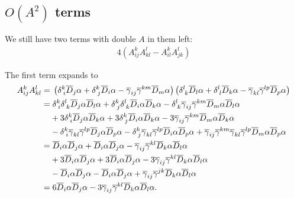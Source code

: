 \documentclass[aps,prd,preprint]{revtex4-1}
\newcommand{\ogamma}{\overline{\gamma}}
\newcommand{\OD}{\overline{D}}
\begin{document}
\subsection{\texorpdfstring{$O(A^2)$}{Double-A}  terms}

We still have two terms with double $A$ in them left:
\begin{align}\label{eq:double-A}
4 \left( A^k_{ij} A^l_{kl} - A^k_{il} A^l_{jk} \right)
\end{align}

The first term expands to
\begin{align}
A^k_{ij} A^l_{kl} = & \;
  \left( \delta^k_{\; i} \OD_j \alpha + \delta^k_{\; j} \OD_i \alpha - \ogamma_{ij} \ogamma^{km} \OD_m \alpha \right)
  \left( \delta^l_{\; k} \OD_l \alpha + \delta^l_{\; l} \OD_k \alpha - \ogamma_{kl} \ogamma^{lp} \OD_p \alpha \right) \\
= & \; \delta^k_{\; i} \delta^l_{\; k} \OD_j \alpha \OD_l \alpha + \delta^k_{\; j} \delta^l_{\; k} \OD_i \alpha  \OD_k \alpha -
  \delta^l_{\; k} \ogamma_{ij} \ogamma^{km} \OD_m \alpha \OD_l \alpha \notag \\
& + 3 \delta^k_{\; i} \OD_j \alpha \OD_k \alpha +3 \delta^k_{\; j} \OD_i \alpha \OD_k \alpha -
  3 \ogamma_{ij} \ogamma^{km} \OD_m \alpha \OD_k \alpha \notag \\
& - \delta^k_{\; i} \ogamma_{kl} \ogamma^{lp} \OD_j \alpha \OD_p \alpha -
  \delta^k_{\; j} \ogamma_{kl} \ogamma^{lp} \OD_i \alpha \OD_p \alpha +
  \ogamma_{ij} \ogamma^{km} \ogamma_{kl} \ogamma^{lp} \OD_m \alpha \OD_p \alpha \\
= & \; \OD_i \alpha \OD_j \alpha + \OD_i \alpha \OD_j \alpha - \ogamma_{ij} \ogamma^{kl} \OD_k \alpha \OD_l \alpha
  \notag \\
& + 3 \OD_i \alpha \OD_j \alpha + 3 \OD_i \alpha \OD_j \alpha - 3 \ogamma_{ij} \ogamma^{kl} \OD_k \alpha \OD_l \alpha
  \notag \\
& - \OD_i \alpha \OD_j \alpha - \OD_i \alpha \OD_j \alpha + \ogamma_{ij} \ogamma^{jk} \OD_k \alpha \OD_l \alpha \\
= & \; 6 \OD_i \alpha \OD_j \alpha - 3 \ogamma_{ij} \ogamma^{kl} \OD_k \alpha \OD_l \alpha. \label{eq:double-A-first}
\end{align}
\end{document}
